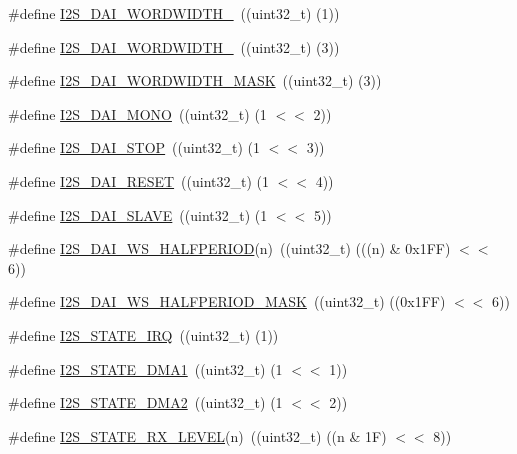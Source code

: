 \begin{DoxyCompactItemize}
\#define \hyperlink{group__I2S__17XX__40XX_ga26e60492415a246afde8d4ede5aa292e}{I2\-S\-\_\-\-D\-A\-I\-\_\-\-W\-O\-R\-D\-W\-I\-D\-T\-H\-\_}~((uint32\-\_\-t) (1))
\item 
\#define \hyperlink{group__I2S__17XX__40XX_ga576561248aa7e6f27c5ef6c51def80ed}{I2\-S\-\_\-\-D\-A\-I\-\_\-\-W\-O\-R\-D\-W\-I\-D\-T\-H\-\_}~((uint32\-\_\-t) (3))
\item 
\#define \hyperlink{group__I2S__17XX__40XX_ga1177f9594c24141162839aafe829fcb9}{I2\-S\-\_\-\-D\-A\-I\-\_\-\-W\-O\-R\-D\-W\-I\-D\-T\-H\-\_\-\-M\-A\-S\-K}~((uint32\-\_\-t) (3))
\item 
\#define \hyperlink{group__I2S__17XX__40XX_ga352feb095d028efc44d17f72beacfae5}{I2\-S\-\_\-\-D\-A\-I\-\_\-\-M\-O\-N\-O}~((uint32\-\_\-t) (1 $<$$<$ 2))
\item 
\#define \hyperlink{group__I2S__17XX__40XX_ga2ed2d2a9f59339ad3cf1f28a78bfcad6}{I2\-S\-\_\-\-D\-A\-I\-\_\-\-S\-T\-O\-P}~((uint32\-\_\-t) (1 $<$$<$ 3))
\item 
\#define \hyperlink{group__I2S__17XX__40XX_gae57a0b564a399a726a9a6737f5733beb}{I2\-S\-\_\-\-D\-A\-I\-\_\-\-R\-E\-S\-E\-T}~((uint32\-\_\-t) (1 $<$$<$ 4))
\item 
\#define \hyperlink{group__I2S__17XX__40XX_ga664f6b8ac38d7b3a23aae4e7a2fa1c6f}{I2\-S\-\_\-\-D\-A\-I\-\_\-\-S\-L\-A\-V\-E}~((uint32\-\_\-t) (1 $<$$<$ 5))
\item 
\#define \hyperlink{group__I2S__17XX__40XX_gab175fcd8e7e80e59833b596a90b16f79}{I2\-S\-\_\-\-D\-A\-I\-\_\-\-W\-S\-\_\-\-H\-A\-L\-F\-P\-E\-R\-I\-O\-D}(n)~((uint32\-\_\-t) (((n) \& 0x1\-F\-F) $<$$<$ 6))
\item 
\#define \hyperlink{group__I2S__17XX__40XX_gaa960b95856c5f78a0eaed42d383dd124}{I2\-S\-\_\-\-D\-A\-I\-\_\-\-W\-S\-\_\-\-H\-A\-L\-F\-P\-E\-R\-I\-O\-D\-\_\-\-M\-A\-S\-K}~((uint32\-\_\-t) ((0x1\-F\-F) $<$$<$ 6))
\item 
\#define \hyperlink{group__I2S__17XX__40XX_gaa412bd295235fcd4d7f0ad284d9386de}{I2\-S\-\_\-\-S\-T\-A\-T\-E\-\_\-\-I\-R\-Q}~((uint32\-\_\-t) (1))
\item 
\#define \hyperlink{group__I2S__17XX__40XX_ga0e9a701addd279db953ca34d56487dbd}{I2\-S\-\_\-\-S\-T\-A\-T\-E\-\_\-\-D\-M\-A1}~((uint32\-\_\-t) (1 $<$$<$ 1))
\item 
\#define \hyperlink{group__I2S__17XX__40XX_ga84dfa37fbee79986ec79f4d856b8df24}{I2\-S\-\_\-\-S\-T\-A\-T\-E\-\_\-\-D\-M\-A2}~((uint32\-\_\-t) (1 $<$$<$ 2))
\item 
\#define \hyperlink{group__I2S__17XX__40XX_gab51548f7e41cb523a77beb7c88c5d33a}{I2\-S\-\_\-\-S\-T\-A\-T\-E\-\_\-\-R\-X\-\_\-\-L\-E\-V\-E\-L}(n)~((uint32\-\_\-t) ((n \& 1\-F) $<$$<$ 8))
$$
\end{DoxyCompactItemize}
